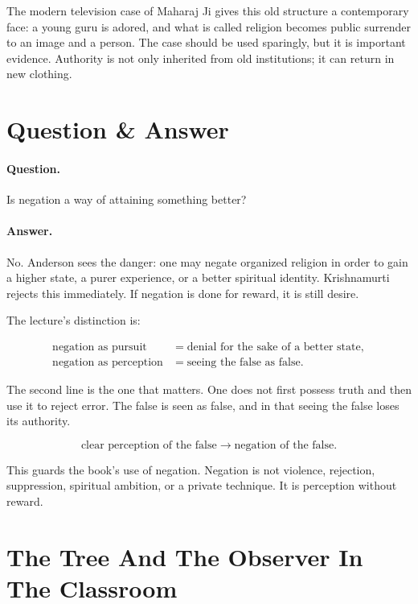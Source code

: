 \documentclass[11pt,oneside]{book}
\begin{document}
The modern television case of Maharaj Ji gives this old structure a contemporary face: a young guru is adored, and what is called religion becomes public surrender to an image and a person. The case should be used sparingly, but it is important evidence. Authority is not only inherited from old institutions; it can return in new clothing.

\section{Question \& Answer}

\paragraph{Question.}
Is negation a way of attaining something better?

\paragraph{Answer.}
No. Anderson sees the danger: one may negate organized religion in order to gain a higher state, a purer experience, or a better spiritual identity. Krishnamurti rejects this immediately. If negation is done for reward, it is still desire.

The lecture's distinction is:

\begin{align}
\text{negation as pursuit}
&=
\text{denial for the sake of a better state},\\
\text{negation as perception}
&=
\text{seeing the false as false}.
\end{align}

The second line is the one that matters. One does not first possess truth and then use it to reject error. The false is seen as false, and in that seeing the false loses its authority.

\begin{equation}
\text{clear perception of the false}
\longrightarrow
\text{negation of the false}.
\end{equation}

This guards the book's use of negation. Negation is not violence, rejection, suppression, spiritual ambition, or a private technique. It is perception without reward.

\section{The Tree And The Observer In The Classroom}
\end{document}
